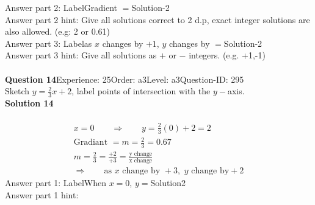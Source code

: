 \documentclass{article}
\begin{document}
Answer part 2: \hspace{10pt}Label\hspace{10pt}Gradient $=$\hspace{10pt}Solution\hspace{10pt}-2\\
Answer part 2 hint: \hspace{15pt}Give all solutions correct to 2 d.p, exact integer solutions are also allowed. (e.g: 2 or 0.61)\\
Answer part 3: \hspace{10pt}Label\hspace{10pt}as $x$ changes by $+1$, $y$ changes by $=$\hspace{10pt}Solution\hspace{10pt}-2\\
Answer part 3 hint: \hspace{15pt}Give all solutions as $+$ or $-$ integers. (e.g. +1,-1)\\
\\[4pt]
\noindent\textbf{Question 14}\hspace{20pt}Experience: 25\hspace{20pt}Order: a3\hspace{20pt}Level: a3\hspace{20pt}Question-ID: 295\\[2pt]
Sketch $y=\displaystyle\frac{2}{3}x+2$, label points of intersection with the $y-$axis.\\[4pt]
\noindent\textbf{Solution 14}\\[2pt]
\\[-35pt]\begin{align*}
&x=0\qquad\Rightarrow\qquad y=\displaystyle\frac{2}{3}(0)+2=2&\\[2pt]
&\text{Gradiant}\,\,=m=\displaystyle\frac{2}{3}=0.67&\\[2pt]
&m=\displaystyle\frac{2}{3}=\displaystyle\frac{+2}{+3}=\displaystyle\frac{\text{y change}}{\text{x change}}&\\[2pt]
& \Rightarrow\qquad \text{as}\,\, x \,\,\text{change by } +3,\,\, y\,\, \text{change by} +2 &
\end{align*}
Answer part 1: \hspace{10pt}Label\hspace{10pt}When $x=0$, $y=$\hspace{10pt}Solution\hspace{10pt}2\\
Answer part 1 hint: \hspace{15pt}\\
\end{document}
